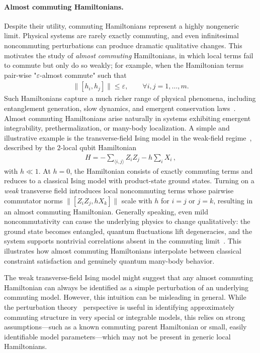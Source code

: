 \documentclass[11pt]{article}
\theoremstyle{plain}
\newcommand{\eps}{\varepsilon}
\begin{document}
\paragraph{Almost commuting Hamiltonians.}
Despite their utility, commuting Hamiltonians represent a highly nongeneric limit.  Physical systems are rarely exactly commuting, and even infinitesimal noncommuting perturbations can produce dramatic qualitative changes. 
 This motivates the study of \emph{almost commuting} Hamiltonians, in 
 which local terms fail to commute but only do so weakly; for example, when the Hamiltonian terms pair-wise "$\eps$-almost commute" such that
\begin{align}
\|[h_i,h_j]\| \leq \eps, \quad\quad \forall i,j=1,\dots,m.   
\end{align}
Such Hamiltonians capture a much richer range of physical phenomena, including 
entanglement generation, slow dynamics, and emergent conservation laws~\cite{Sachdev2011}. Almost 
 commuting Hamiltonians arise naturally in systems exhibiting emergent integrability, prethermalization, or many-body localization. 
A simple and illustrative example is the transverse-field Ising model 
in the weak-field regime~\cite{Sachdev2011}, described by the $2$-local qubit Hamiltonian
\begin{align}\label{eq:ising}
H = -\sum_{\langle i,j \rangle} Z_i Z_j - h \sum_i X_i \, ,
\end{align}
with $h \ll 1$.  At $h=0$, the Hamiltonian consists of exactly 
commuting terms and reduces to a classical Ising model with 
product-state ground states.  Turning on a \emph{weak} transverse field 
introduces local noncommuting terms whose pairwise commutator norms 
$\|[Z_i Z_j,hX_k]\|$
scale with $h$ for $i=j$ or $j=k$, resulting in an almost commuting Hamiltonian. Generally speaking, even
mild noncommutativity can cause the underlying physics to 
change qualitatively: the ground state becomes entangled, quantum fluctuations lift degeneracies, and the system supports nontrivial correlations absent in the commuting limit~\cite{Mbeng_2024}.  This illustrates how almost commuting Hamiltonians interpolate between classical constraint satisfaction and genuinely quantum many-body behavior.

The weak transverse-field Ising model might suggest that any almost commuting Hamiltonian can always be identified as a simple perturbation of an underlying commuting model. However, this intuition can be misleading in general. While the perturbation theory~\cite{Kato:1966:PTL} perspective is useful in identifying approximately commuting structure in very special or integrable models, this relies on strong assumptions---such as a known commuting parent Hamiltonian or small, easily identifiable model parameters---which may not be present in generic local Hamiltonians. 
\end{document}
